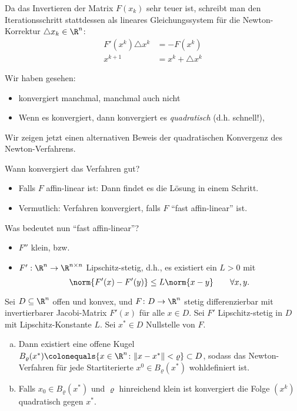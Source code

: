 Da das Invertieren der Matrix $F(x_k)$ sehr teuer ist, schreibt man den Iterationsschritt
stattdessen als lineares Gleichungssystem für die Newton-Korrektur $\triangle x_k \in \R^n$:
\begin{align*}
 F' (x^k) \triangle x^k & = -F (x^k) \\
  x^{k+1} & = x^k+ \triangle x^k
\end{align*}

\bigskip

Wir haben gesehen:

\begin{itemize}
 \item konvergiert manchmal, manchmal auch nicht
 \item Wenn es konvergiert, dann konvergiert es \emph{quadratisch} (d.h. schnell!),
\end{itemize}

\bigskip

Wir zeigen jetzt einen alternativen Beweis der quadratischen Konvergenz des Newton-Verfahrens.

\medskip

Wann konvergiert das Verfahren gut?
\begin{itemize}
\item Falls $F$ affin-linear ist: Dann findet es die Lösung in einem Schritt.
\item Vermutlich: Verfahren konvergiert, falls $F$ "`fast affin-linear"' ist.
\end{itemize}
Was bedeutet nun "`fast affin-linear"'?
\begin{itemize}
 \item $F''$ klein, bzw.
 \item $F' : \R^n \to \R^{n \times n}$ Lipschitz-stetig, d.h., es existiert ein $L>0$ mit
  \begin{equation*}
    \norm{F'(x)-F'(y)} \leq L \norm{x-y}
    \qquad
    \forall x,y.
  \end{equation*}
\end{itemize}

\begin{satz}
\label{thm:nichtlineare_gleichungen:fischer_newton_konvergenz}
 Sei $D \subseteq \R^n$ offen und konvex, und $F \colon D \to \R^n$ stetig differenzierbar
 mit invertierbarer Jacobi-Matrix $F'(x)$ für alle $x \in D$.
 Sei $F'$ Lipschitz-stetig in $D$ mit Lipschitz-Konstante $L$.
 Sei $x^* \in D$ Nullstelle von $F$.
 \begin{enumerate}[a)]
  \item Dann existiert eine offene Kugel $B_{\varrho}(x^* )\colonequals\lbrace x \in \R^n \colon \Vert x-x^* \Vert <\varrho \rbrace \subset D$, sodass das Newton-Verfahren für jede Startiterierte $x^0 \in B_{\varrho}(x^*)$ wohldefiniert ist.

 \item Falls $x_0 \in B_\varrho(x^*)$ und $\varrho$ hinreichend klein ist konvergiert die Folge $(x^k)$ quadratisch gegen $x^*$.
 \end{enumerate}
\end{satz}

